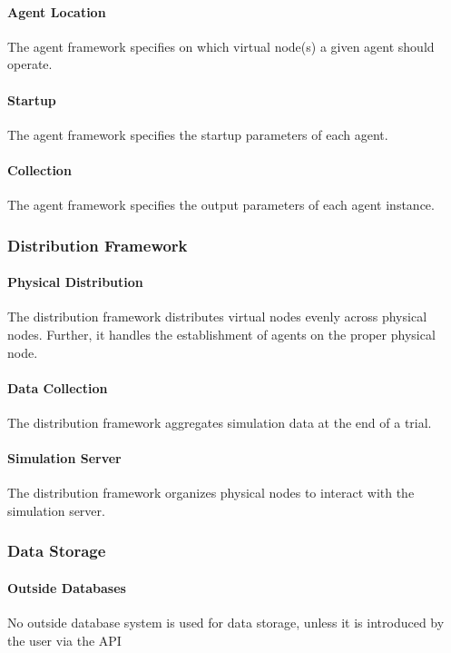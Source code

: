 \documentclass[titlepage]{article}
\begin{document}
\paragraph{Agent Location} The agent framework specifies on which virtual node(s) a given agent should operate.
\paragraph{Startup} The agent framework specifies the startup parameters of each agent.
\paragraph{Collection} The agent framework specifies the output parameters of each agent instance.

\subsubsection{Distribution Framework}
\paragraph{Physical Distribution} The distribution framework distributes virtual nodes evenly across physical
nodes.  Further, it handles the establishment of agents on the proper physical node.

\paragraph{Data Collection} The distribution framework aggregates simulation data at the end of a trial.

\paragraph{Simulation Server} The distribution framework organizes physical nodes to interact with the simulation
server.


\subsubsection{Data Storage%
  \label{data-storage}%
}
    \paragraph{Outside Databases} No outside database system is used for data storage, unless it is introduced by the user via the API
\end{document}
